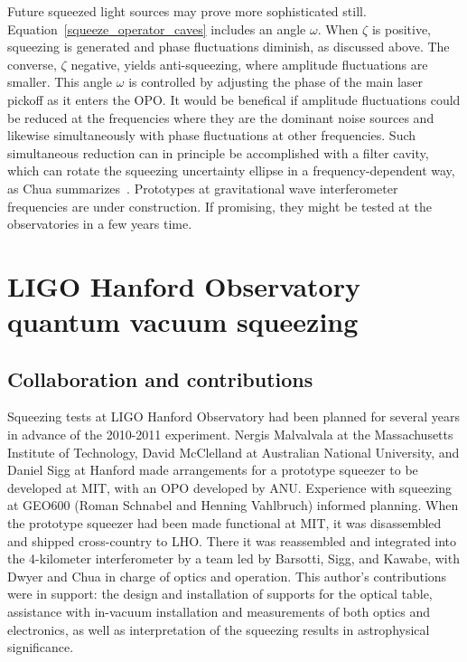 Future squeezed light sources may prove more sophisticated still.
Equation~\ref{squeeze_operator_caves} includes an angle $\omega$. When $\zeta$ is positive, squeezing is generated and phase fluctuations diminish, as discussed above. 
The converse, $\zeta$ negative, yields anti-squeezing, where amplitude fluctuations are smaller. 
This angle $\omega$ is controlled by adjusting the phase of the main laser pickoff as it enters the OPO.
It would be benefical if amplitude fluctuations could be reduced at the frequencies where they are the dominant noise sources and likewise simultaneously with phase fluctuations at other frequencies. 
Such simultaneous reduction can in principle be accomplished with a filter cavity, which can rotate the squeezing uncertainty ellipse in a frequency-dependent way, as Chua summarizes~\cite{ChuaThesis}.
Prototypes at gravitational wave interferometer frequencies are under construction.
If promising, they might be tested at the observatories in a few years time.

    \section{LIGO Hanford Observatory quantum vacuum squeezing}
    \label{LHO_squeeze}


        \subsection{Collaboration and contributions}
        \label{contributions}

        Squeezing tests at LIGO Hanford Observatory had been planned for several years in advance of the 2010-2011 experiment.
Nergis Malvalvala at the Massachusetts Institute of Technology, David McClelland at Australian National University, and Daniel Sigg at Hanford made arrangements for a prototype squeezer to be developed at MIT, with an OPO developed by ANU.
Experience with squeezing at GEO600 (Roman Schnabel and Henning Vahlbruch) informed planning. 
When the prototype squeezer had been made functional at MIT, it was disassembled and shipped cross-country to LHO.
There it was reassembled and integrated into the 4-kilometer interferometer by a team led by Barsotti, Sigg, and Kawabe, with Dwyer and Chua in charge of optics and operation.
This author's contributions were in support: the design and installation of supports for the optical table, assistance with in-vacuum installation and measurements of both optics and electronics, as well as interpretation of the squeezing results in astrophysical significance.

